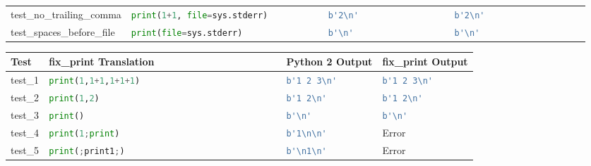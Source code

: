 \begin{table}[]
\begin{tabular}{@{}l|llll@{}}
    test\_no\_trailing\_comma             & \lstinline[language=Python, style=pythonstyle]|print(1+1, file=sys.stderr)          | & \lstinline[language=Python, style=pythonstyle]|b'2\n'                 | & \lstinline[language=Python, style=pythonstyle]|b'2\n'                 | \\ 
    test\_spaces\_before\_file            & \lstinline[language=Python, style=pythonstyle]|print(file=sys.stderr)               | & \lstinline[language=Python, style=pythonstyle]|b'\n'                  | & \lstinline[language=Python, style=pythonstyle]|b'\n'                  | \\ \bottomrule
    \end{tabular}
\end{table}

\begin{table}[]
    \begin{tabular}{@{}l|lll@{}}
    \toprule
    Test                                  & fix\_print Translation                        & Python 2 Output                        & fix\_print Output             \\ \midrule
    test\_1                               & \lstinline[language=Python, style=pythonstyle]|print(1,1+1,1+1+1)                           | & \lstinline[language=Python, style=pythonstyle]|b'1 2 3\n'   |           & \lstinline[language=Python, style=pythonstyle]|b'1 2 3\n'    | \\
    test\_2                               & \lstinline[language=Python, style=pythonstyle]|print(1,2)                                   | & \lstinline[language=Python, style=pythonstyle]|b'1 2\n'  |              & \lstinline[language=Python, style=pythonstyle]|b'1 2\n'      | \\
    test\_3                               & \lstinline[language=Python, style=pythonstyle]|print()                                      | & \lstinline[language=Python, style=pythonstyle]|b'\n'   |                & \lstinline[language=Python, style=pythonstyle]|b'\n'         | \\
    test\_4                               & \lstinline[language=Python, style=pythonstyle]|print(1;print)                               | & \lstinline[language=Python, style=pythonstyle]|b'1\n\n'| & Error                         \\
    test\_5                               & \lstinline[language=Python, style=pythonstyle]|print(;print1;)                              | & \lstinline[language=Python, style=pythonstyle]|b'\n1\n'| & Error                         \\

\end{tabular}
\end{table}
